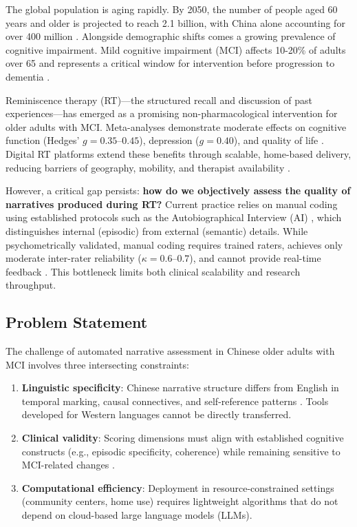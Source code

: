 \documentclass[11pt]{article}
\begin{document}
The global population is aging rapidly. By 2050, the number of people aged 60 years and older is projected to reach 2.1 billion, with China alone accounting for over 400 million \citep{un2024}. Alongside demographic shifts comes a growing prevalence of cognitive impairment. Mild cognitive impairment (MCI) affects 10-20\% of adults over 65 and represents a critical window for intervention before progression to dementia \citep{petersen2016}.

Reminiscence therapy (RT)---the structured recall and discussion of past experiences---has emerged as a promising non-pharmacological intervention for older adults with MCI. Meta-analyses demonstrate moderate effects on cognitive function (Hedges' $g = 0.35$--$0.45$), depression ($g = 0.40$), and quality of life \citep{pu2025,ni2026}. Digital RT platforms extend these benefits through scalable, home-based delivery, reducing barriers of geography, mobility, and therapist availability \citep{wang2026}.

However, a critical gap persists: \textbf{how do we objectively assess the quality of narratives produced during RT?} Current practice relies on manual coding using established protocols such as the Autobiographical Interview (AI) \citep{levine2002}, which distinguishes internal (episodic) from external (semantic) details. While psychometrically validated, manual coding requires trained raters, achieves only moderate inter-rater reliability ($\kappa = 0.6$--$0.7$), and cannot provide real-time feedback \citep{spencer2020}. This bottleneck limits both clinical scalability and research throughput.

\subsection{Problem Statement}

The challenge of automated narrative assessment in Chinese older adults with MCI involves three intersecting constraints:

\begin{enumerate}[label=(\arabic*)]
    \item \textbf{Linguistic specificity}: Chinese narrative structure differs from English in temporal marking, causal connectives, and self-reference patterns \citep{chen2021}. Tools developed for Western languages cannot be directly transferred.
    \item \textbf{Clinical validity}: Scoring dimensions must align with established cognitive constructs (e.g., episodic specificity, coherence) while remaining sensitive to MCI-related changes \citep{murphy2023}.
    \item \textbf{Computational efficiency}: Deployment in resource-constrained settings (community centers, home use) requires lightweight algorithms that do not depend on cloud-based large language models (LLMs).
\end{enumerate}
\end{document}
